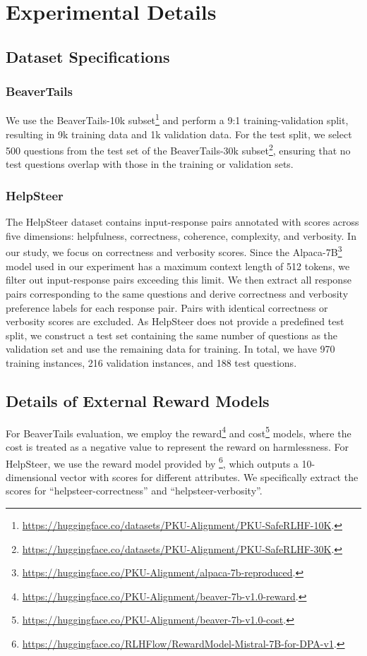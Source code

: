 \section{Experimental Details}
\label{appd A}
\subsection{Dataset Specifications}
\label{appd A1}
\subsubsection{BeaverTails}
We use the BeaverTails-10k subset\footnote{\url{https://huggingface.co/datasets/PKU-Alignment/PKU-SafeRLHF-10K}.} and perform a 9:1 training-validation split, resulting in 9k training data and 1k validation data. For the test split, we select 500 questions from the test set of the BeaverTails-30k subset\footnote{\url{https://huggingface.co/datasets/PKU-Alignment/PKU-SafeRLHF-30K}.}, ensuring that no test questions overlap with those in the training or validation sets.
\subsubsection{HelpSteer}
The HelpSteer dataset \cite{DBLP:conf/acl/WangLXYDQZZ24} contains input-response pairs annotated with scores across five dimensions: helpfulness, correctness, coherence, complexity, and verbosity. In our study, we focus on correctness and verbosity scores. Since the Alpaca-7B\footnote{\url{https://huggingface.co/PKU-Alignment/alpaca-7b-reproduced}.} model used in our experiment has a maximum context length of 512 tokens, we filter out input-response pairs exceeding this limit. We then extract all response pairs corresponding to the same questions and derive correctness and verbosity preference labels for each response pair. Pairs with identical correctness or verbosity scores are excluded. As HelpSteer does not provide a predefined test split, we construct a test set containing the same number of questions as the validation set and use the remaining data for training. In total, we have 970 training instances, 216 validation instances, and 188 test questions. 

\subsection{Details of External Reward Models} \label{sec:reward_model_detail}
For BeaverTails evaluation, we employ the reward\footnote{\url{https://huggingface.co/PKU-Alignment/beaver-7b-v1.0-reward}.} and cost\footnote{\url{https://huggingface.co/PKU-Alignment/beaver-7b-v1.0-cost}.} models, where the cost is treated as a negative value to represent the reward on harmlessness. For HelpSteer, we use the reward model provided by \citet{DBLP:conf/acl/WangLXYDQZZ24}\footnote{\url{https://huggingface.co/RLHFlow/RewardModel-Mistral-7B-for-DPA-v1}.}, which outputs a 10-dimensional vector with scores for different attributes. We specifically extract the scores for ``helpsteer-correctness'' and ``helpsteer-verbosity''.

